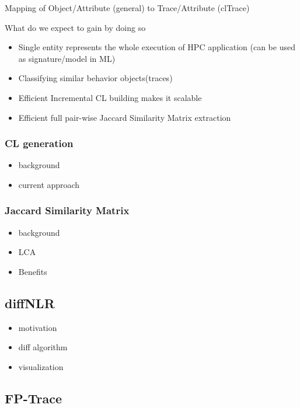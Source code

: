 Mapping of Object/Attribute (general) to Trace/Attribute (clTrace)

What do we expect to gain by doing so
\begin{itemize}
\item Single entity represents the whole execution of HPC application (can be used as signature/model in ML)
\item Classifying similar behavior objects(traces)
\item Efficient Incremental CL building makes it scalable 
\item Efficient full pair-wise Jaccard Similarity Matrix extraction 
\end{itemize}
\subsubsection{CL generation}

\begin{itemize}
\item background
\item current approach
\end{itemize}

\subsubsection{Jaccard Similarity Matrix}

\begin{itemize}
\item background
\item LCA
\item Benefits
\end{itemize}


\subsection{diffNLR}
\begin{itemize}
\item motivation
\item diff algorithm
\item visualization
\end{itemize}

\subsection{FP-Trace}

